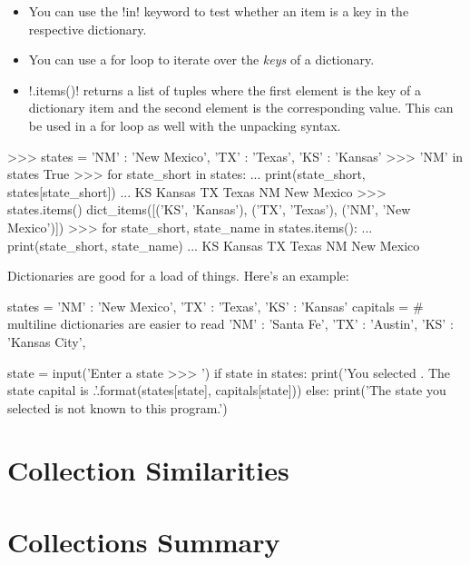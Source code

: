 \documentclass[11pt]{cselabheader}
\begin{document}
\begin{itemize}
  \item You can use the \pythoninline!in! keyword to test whether an item is a
    key in the respective dictionary.
  \item You can use a for loop to iterate over the \emph{keys} of a dictionary.
  \item \pythoninline!.items()! returns a list of tuples where the first element
    is the key of a dictionary item and the second element is the corresponding
    value. This can be used in a for loop as well with the unpacking syntax.
\end{itemize}

\begin{pyconcode}
>>> states = {'NM' : 'New Mexico', 'TX' : 'Texas', 'KS' : 'Kansas'}
>>> 'NM' in states
True
>>> for state_short in states:
...     print(state_short, states[state_short])
...
KS Kansas
TX Texas
NM New Mexico
>>> states.items()
dict_items([('KS', 'Kansas'), ('TX', 'Texas'), ('NM', 'New Mexico')])
>>> for state_short, state_name in states.items():
...     print(state_short, state_name)
...
KS Kansas
TX Texas
NM New Mexico
\end{pyconcode}

Dictionaries are good for a load of things. Here's an example:

\begin{python3code}
states = {'NM' : 'New Mexico', 'TX' : 'Texas', 'KS' : 'Kansas'}
capitals = { # multiline dictionaries are easier to read
  'NM' : 'Santa Fe',
  'TX' : 'Austin',
  'KS' : 'Kansas City',
}

state = input('Enter a state >>> ')
if state in states:
    print('You selected {}. The state capital is {}.'.format(states[state], 
        capitals[state]))
else:
    print('The state you selected is not known to this program.')
\end{python3code}

\pagebreak
\section{Collection Similarities}

\section{Collections Summary}
\end{document}
